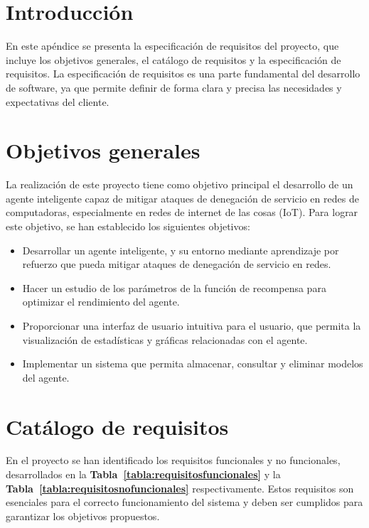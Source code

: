 
\section{Introducción}

En este apéndice se presenta la especificación de requisitos del proyecto, que incluye los objetivos generales, el catálogo de requisitos y la especificación de requisitos. La especificación de requisitos es una parte fundamental del desarrollo de software, ya que permite definir de forma clara y precisa las necesidades y expectativas del cliente.


\section{Objetivos generales}
La realización de este proyecto tiene como objetivo principal el desarrollo de un agente inteligente capaz de mitigar ataques de denegación de servicio en redes de computadoras, especialmente en redes de internet de las cosas (IoT). 
Para lograr este objetivo, se han establecido los siguientes objetivos:
\begin{itemize}
	\item Desarrollar un agente inteligente, y su entorno mediante aprendizaje por refuerzo que pueda mitigar ataques de denegación de servicio en redes.
	\item Hacer un estudio de los parámetros de la función de recompensa para optimizar el rendimiento del agente.
	\item Proporcionar una interfaz de usuario intuitiva para el usuario, que permita la visualización de estadísticas y gráficas relacionadas con el agente.
	\item Implementar un sistema que permita almacenar, consultar y eliminar modelos del agente.
\end{itemize}

\section{Catálogo de requisitos}
En el proyecto se han identificado los requisitos funcionales y no funcionales, desarrollados en la \textbf{Tabla~\ref{tabla:requisitosfuncionales}} y la \textbf{Tabla~\ref{tabla:requisitosnofuncionales}} respectivamente. Estos requisitos son esenciales para el correcto funcionamiento del sistema y deben ser cumplidos para garantizar los objetivos propuestos.


